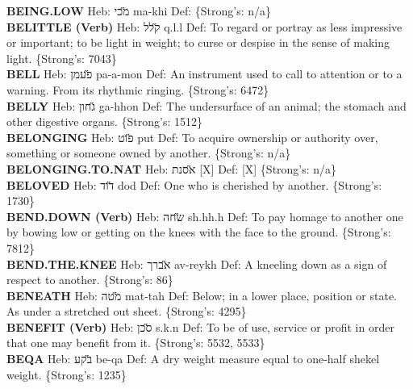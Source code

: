 {\textbf{BEING.LOW} Heb: {\large\H מכי} ma-khi Def: \{Strong's: n/a\}\hfill{}\\

\textbf{BELITTLE (Verb)} Heb: {\large\H קלל} q.l.l Def: To regard or portray as less impressive or important; to be light in weight; to curse or despise in the sense of making light. \{Strong's: 7043\}\hfill{}\\

\textbf{BELL} Heb: {\large\H פעמן} pa-a-mon Def: An instrument used to call to attention or to a warning. From its rhythmic ringing. \{Strong's: 6472\}\hfill{}\\

\textbf{BELLY} Heb: {\large\H גחון} ga-hhon Def: The undersurface of an animal; the stomach and other digestive organs. \{Strong's: 1512\}\hfill{}\\

\textbf{BELONGING} Heb: {\large\H פוט} put Def: To acquire ownership or authority over, something or someone owned by another. \{Strong's: n/a\}\hfill{}\\

\textbf{BELONGING.TO.NAT} Heb: {\large\H אסנת} {[}X{]} Def: {[}X{]} \{Strong's: n/a\}\hfill{}\\

\textbf{BELOVED} Heb: {\large\H דוד} dod Def: One who is cherished by another. \{Strong's: 1730\}\hfill{}\\

\textbf{BEND.DOWN (Verb)} Heb: {\large\H שחה} sh.hh.h Def: To pay homage to another one by bowing low or getting on the knees with the face to the ground. \{Strong's: 7812\}\hfill{}\\

\textbf{BEND.THE.KNEE} Heb: {\large\H אברך} av-reykh Def: A kneeling down as a sign of respect to another. \{Strong's: 86\}\hfill{}\\

\textbf{BENEATH} Heb: {\large\H מטה} mat-tah Def: Below; in a lower place, position or state. As under a stretched out sheet. \{Strong's: 4295\}\hfill{}\\

\textbf{BENEFIT (Verb)} Heb: {\large\H סכן} s.k.n Def: To be of use, service or profit in order that one may benefit from it. \{Strong's: 5532, 5533\}\hfill{}\\

\textbf{BEQA} Heb: {\large\H בקע} be-qa Def: A dry weight measure equal to one-half shekel weight. \{Strong's: 1235\}\hfill{}\\

}
